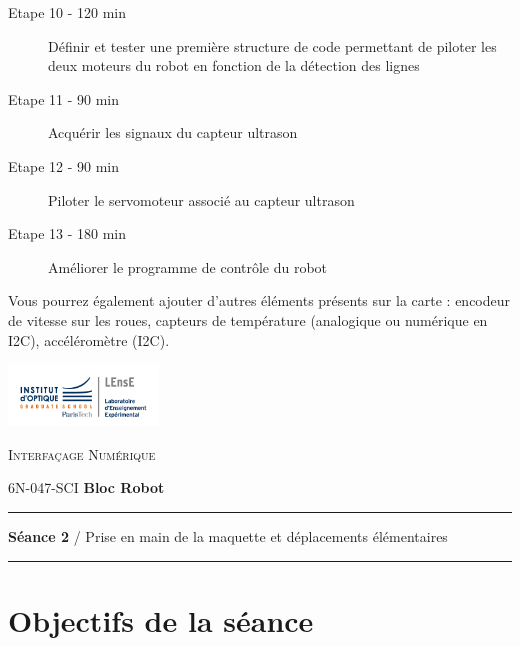 \documentclass[a4paper,11pt,titlepage]{article} %
\begin{document}
\begin{description}
	\item[Etape 10 - 120 min] Définir et tester une première structure de code permettant de piloter les deux moteurs du robot en fonction de la détection des lignes
	\item[Etape 11 - 90 min] Acquérir les signaux du capteur ultrason
	\item[Etape 12 - 90 min] Piloter le servomoteur associé au capteur ultrason
	\item[Etape 13 - 180 min] Améliorer le programme de contrôle du robot
\end{description}

Vous pourrez également ajouter d'autres éléments présents sur la carte : encodeur de vitesse sur les roues, capteurs de température (analogique ou numérique en I2C), accéléromètre (I2C).



\newpage
\strut %
\begin{minipage}[c]{.25\linewidth}
	\includegraphics[width=4cm]{images/Logo-LEnsE.png}
\end{minipage} \hfill
\begin{minipage}[c]{.4\linewidth}

\begin{center}
\vspace{0.3cm}
{\Large \textsc{Interfaçage Numérique}}

\medskip

6N-047-SCI \qquad \textbf{\Large Bloc Robot}

\end{center}
\end{minipage}\hfill

\vspace{0.5cm}

\noindent \rule{\linewidth}{1pt}

{\noindent\Large \rule[-7pt]{0pt}{30pt} \textbf{Séance 2} / Prise en main de la maquette et déplacements élémentaires} 

\noindent \rule{\linewidth}{1pt}


\section{Objectifs de la séance}
\end{document}
